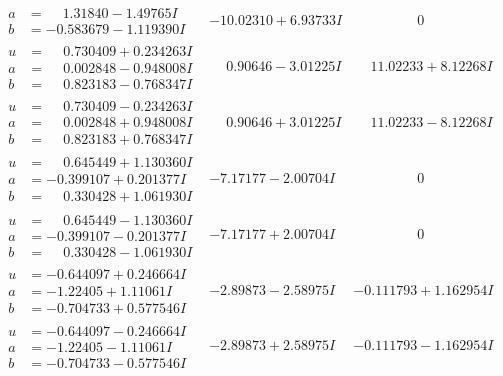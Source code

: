 \documentclass[1p]{elsarticle_modified}
\theoremstyle{definition}
\begin{document}
$$\begin{array}{c|c|c}
\begin{aligned}
a &= \phantom{-}1.31840 - 1.49765 I \\
b &= -0.583679 - 1.119390 I\end{aligned}
 & -10.02310 + 6.93733 I & \phantom{-0.000000 } 0 \\ \hline\begin{aligned}
u &= \phantom{-}0.730409 + 0.234263 I \\
a &= \phantom{-}0.002848 - 0.948008 I \\
b &= \phantom{-}0.823183 - 0.768347 I\end{aligned}
 & \phantom{-}0.90646 - 3.01225 I & \phantom{-}11.02233 + 8.12268 I \\ \hline\begin{aligned}
u &= \phantom{-}0.730409 - 0.234263 I \\
a &= \phantom{-}0.002848 + 0.948008 I \\
b &= \phantom{-}0.823183 + 0.768347 I\end{aligned}
 & \phantom{-}0.90646 + 3.01225 I & \phantom{-}11.02233 - 8.12268 I \\ \hline\begin{aligned}
u &= \phantom{-}0.645449 + 1.130360 I \\
a &= -0.399107 + 0.201377 I \\
b &= \phantom{-}0.330428 + 1.061930 I\end{aligned}
 & -7.17177 - 2.00704 I & \phantom{-0.000000 } 0 \\ \hline\begin{aligned}
u &= \phantom{-}0.645449 - 1.130360 I \\
a &= -0.399107 - 0.201377 I \\
b &= \phantom{-}0.330428 - 1.061930 I\end{aligned}
 & -7.17177 + 2.00704 I & \phantom{-0.000000 } 0 \\ \hline\begin{aligned}
u &= -0.644097 + 0.246664 I \\
a &= -1.22405 + 1.11061 I \\
b &= -0.704733 + 0.577546 I\end{aligned}
 & -2.89873 - 2.58975 I & -0.111793 + 1.162954 I \\ \hline\begin{aligned}
u &= -0.644097 - 0.246664 I \\
a &= -1.22405 - 1.11061 I \\
b &= -0.704733 - 0.577546 I\end{aligned}
 & -2.89873 + 2.58975 I & -0.111793 - 1.162954 I \\ \hline\begin{aligned}

\end{aligned}
\end{array}$$
\end{document}
